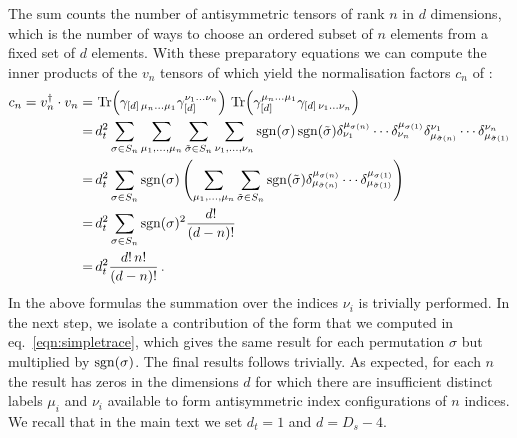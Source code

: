 %
The sum counts the number of antisymmetric tensors of
rank $n$ in $d$ dimensions, which is the number of ways to 
choose an ordered subset of $n$ elements from a fixed set of $d$
elements.
%
With these preparatory equations we can
compute the inner products of the $v_n$ tensors of 
which yield the normalisation factors $c_n$
of :
\begin{align}\begin{split}
\label{eq:cnCalc}
c_n=v_n^\dagger\cdot v_n =&\,
%
\Tr(\gamma_{[d]\,\mu_n \ldots \mu_1} \gamma_{[d]}^
{\nu_1 \ldots \nu_n}) \,
%
\Tr(\gamma_{[d]}^{\mu_n \ldots \mu_1} \gamma_{
[d]\,\nu_1 \ldots \nu_n}) \\
=&\,
d_t^2 \sum_{\sigma\in  S_n} 
\sum_{\mu_1,\ldots,\mu_n}
\sum_{\tilde \sigma\in S_n}
\sum_{\nu_1,\ldots,\nu_n}
%
 \sgn(\sigma)
 \sgn(\tilde\sigma)
\delta^{\mu_{\sigma(n)}}_{\nu_1}\cdots\delta^{\mu_{\sigma(1)}}_{\nu_n}
\delta_{\mu_{\tilde\sigma(n)}}^{\nu_1}\cdots
\delta_{\mu_{\tilde\sigma(1)}}^{\nu_n}
\\
%
=&\,d_t^2 \sum_{\sigma\in  S_n} 
\sgn(\sigma)
\left(
\sum_{\mu_1,\ldots,\mu_n}\sum_{\tilde \sigma\in S_n}
%
 \sgn(\tilde\sigma)
 \delta^{\mu_{\sigma(n)}}_{\mu_{\tilde\sigma(n)}}
 \cdots
 \delta^{\mu_{\sigma(1)}}_{\mu_{\tilde\sigma(1)}}
 \right)
\\
%
=&\, d_t^2 \sum_{\sigma\in  S_n} 
\sgn(\sigma)^2 \frac{d!}{(d-n)!}\\
=&\, d_t^2 \frac{d!\,n!}{(d-n)!}\,.
%
\end{split}\end{align}
%
In the above formulas the summation over the indices $\nu_i$ is 
trivially performed. In the next step, we isolate a contribution
of the form that we computed in eq.~\eqref{eqn:simpletrace},
which gives the same result for each permutation $\sigma$ but
multiplied by $\operatorname{sgn}(\sigma)$. The final results follows
trivially.
As expected, for each $n$ the result has zeros in the dimensions
$d$ for which there are insufficient distinct labels 
$\mu_i$ and $\nu_i$ available to form antisymmetric index 
configurations of $n$ indices.
We recall that in the main text we set $d_t=1$ and $d=D_s-4$.


